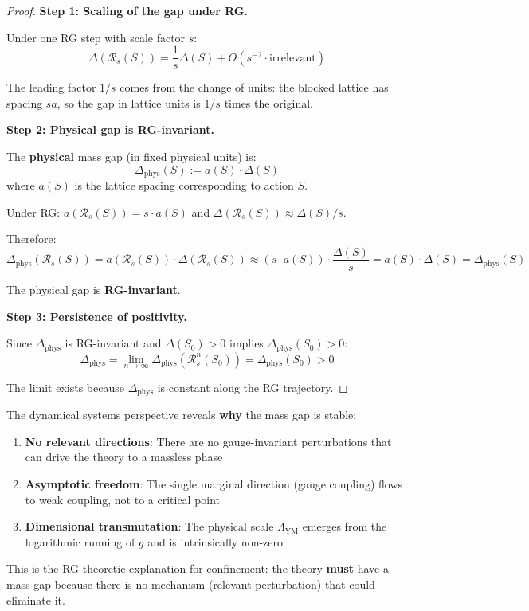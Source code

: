 \begin{proof}
\textbf{Step 1: Scaling of the gap under RG.}

Under one RG step with scale factor $s$:
\[
\Delta(\mathcal{R}_s(S)) = \frac{1}{s} \Delta(S) + O(s^{-2} \cdot \text{irrelevant})
\]

The leading factor $1/s$ comes from the change of units: the blocked lattice 
has spacing $sa$, so the gap in lattice units is $1/s$ times the original.

\textbf{Step 2: Physical gap is RG-invariant.}

The \textbf{physical} mass gap (in fixed physical units) is:
\[
\Delta_{\text{phys}}(S) := a(S) \cdot \Delta(S)
\]
where $a(S)$ is the lattice spacing corresponding to action $S$.

Under RG: $a(\mathcal{R}_s(S)) = s \cdot a(S)$ and $\Delta(\mathcal{R}_s(S)) \approx \Delta(S)/s$.

Therefore:
\[
\Delta_{\text{phys}}(\mathcal{R}_s(S)) = a(\mathcal{R}_s(S)) \cdot \Delta(\mathcal{R}_s(S)) 
\approx (s \cdot a(S)) \cdot \frac{\Delta(S)}{s} = a(S) \cdot \Delta(S) = \Delta_{\text{phys}}(S)
\]

The physical gap is \textbf{RG-invariant}.

\textbf{Step 3: Persistence of positivity.}

Since $\Delta_{\text{phys}}$ is RG-invariant and $\Delta(S_0) > 0$ implies 
$\Delta_{\text{phys}}(S_0) > 0$:
\[
\Delta_{\text{phys}} = \lim_{n \to \infty} \Delta_{\text{phys}}(\mathcal{R}_s^n(S_0)) = \Delta_{\text{phys}}(S_0) > 0
\]

The limit exists because $\Delta_{\text{phys}}$ is constant along the RG trajectory.
\end{proof}

\begin{remark}
The dynamical systems perspective reveals \textbf{why} the mass gap is stable:
\begin{enumerate}
\item \textbf{No relevant directions}: There are no gauge-invariant perturbations 
that can drive the theory to a massless phase
\item \textbf{Asymptotic freedom}: The single marginal direction (gauge coupling) 
flows to weak coupling, not to a critical point
\item \textbf{Dimensional transmutation}: The physical scale $\Lambda_{\text{YM}}$ 
emerges from the logarithmic running of $g$ and is intrinsically non-zero
\end{enumerate}

This is the RG-theoretic explanation for confinement: the theory \textbf{must} 
have a mass gap because there is no mechanism (relevant perturbation) that 
could eliminate it.
\end{remark}


